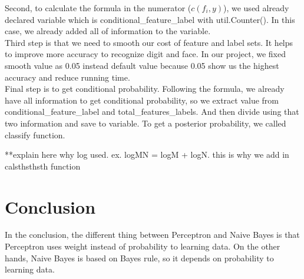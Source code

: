 \documentclass{article}
\begin{document}
        Second, to calculate the formula in the numerator ($c(f_i,y)$), we used already declared variable which is conditional\_feature\_label with util.Counter(). In this case, we already added all of information to the variable. \\
        
        Third step is that we need to smooth our cost of feature and label sets. It helps to improve more accuracy to recognize digit and face. In our project, we fixed smooth value as 0.05 instead default value because 0.05 show us the highest accuracy and reduce running time.\\
        
        Final step is to get conditional probability. Following the formula, we already have all information to get conditional probability, so we extract value from conditional\_feature\_label and total\_features\_labels. And then divide using that two information and save to variable. To get a posterior probability, we called classify function.
        
        **explain here why log used. ex. logMN = logM + logN. this is why we add in calsthsthsth function

\section{Conclusion}
\hspace*{10mm}In the conclusion, the different thing between Perceptron and Naive Bayes is that Perceptron uses weight instead of probability to learning data. On the other hands, Naive Bayes is based on Bayes rule, so it depends on probability to learning data.\\
\end{document}

